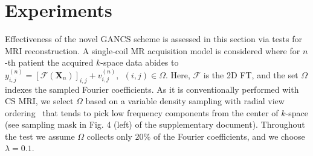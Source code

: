 \documentclass{journal}
\def \cF {\mathcal{F}}
\def \bX {\mathbf{X}}
\begin{document}
   










\section{Experiments}
\label{sec:eval}
%
Effectiveness of the novel GANCS scheme is assessed in this section via tests for MRI reconstruction. A single-coil MR acquisition model is considered where for $n$-th patient the acquired $k$-space data abides to $y_{i,j}^{(n)} = [\cF(\bX_n)]_{i,j} + v_{i,j}^{(n)},~~(i,j) \in \Omega$. Here, $\cF$ is the 2D FT, and the set $\Omega$ indexes the sampled Fourier coefficients. As it is conventionally performed with CS MRI, we select $\Omega$ based on a variable density sampling with radial view ordering~\cite{} that tends to pick low frequency components from the center of $k$-space (see sampling mask in Fig. 4 (left) of the supplementary document). Throughout the test we assume $\Omega$ collects only $20\%$ of the Fourier coefficients, and we choose $\lambda=0.1$. 
%

\end{document}
